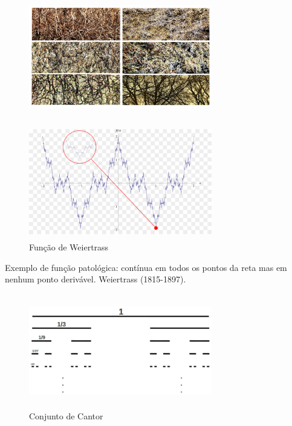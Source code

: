 \documentclass{beamer}
\begin{document}
\begin{frame}
	\begin{figure}[htb]
	\centering
    	    \includegraphics[width=8cm, height=5cm]{images/art1.jpg}
       	        \vspace{0.01em}
	\end{figure}
\end{frame}
\begin{frame}
	\begin{figure}[htb]
	\centering
    	    \includegraphics[width=8cm, height=5cm]{images/strass.jpg}
       	        \vspace{0.01em}
       	 \caption{Função de Weiertrass}
	\end{figure}
    Exemplo de função patológica: contínua em todos os pontos da reta mas em nenhum ponto derivável. Weiertrass (1815-1897).
\end{frame}
\begin{frame}
	\begin{figure}[htb]
	\centering
    	    \includegraphics[width=8cm, height=5cm]{images/cs1.jpg}
       	        \vspace{0.01em}
            \caption{Conjunto de Cantor}
	\end{figure}
\end{frame}
\end{document}
